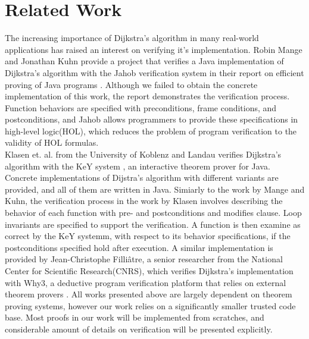 
\section{Related Work}
The increasing importance of Dijkstra's algorithm in many real-world applications has raised an interest on verifying it's implementation. Robin Mange and Jonathan Kuhn provide a project that verifies a Java implementation of Dijkstra's algorithm with the Jahob verification system in their report on efficient proving of Java programs \cite{Mange}. Although we failed to obtain the concrete implementation of this work, the report demonstrates the verification process. Function behaviors are specified with preconditions, frame conditions, and postconditions, and Jahob allows programmers to provide these specifications in high-level logic(HOL), which reduces the problem of program verification to the validity of HOL formulas. 
\\

Klasen et. al. from the University of Koblenz and Landau verifies Dijkstra's algorithm with the KeY system \cite{Klasen}, an interactive theorem prover for Java. Concrete implementations of Dijstra's algorithm with different variants are provided, and all of them are written in Java. Simiarly to the work by Mange and Kuhn, the verification process in the work by Klasen involves describing the behavior of each function with pre- and postconditions and modifies clause. Loop invariants are specified to support the verification. A function is then examine as correct by the KeY systemm, with respect to its behavior specifications, if the postconditions specified hold after execution. A similar implementation is provided by Jean-Christophe Filliâtre, a senior researcher from the National Center for Scientific Research(CNRS), which verifies Dijkstra's implementation with Why3, a deductive program verification platform that relies on external theorem provers \cite{Jean}\cite{why3}. All works presented above are largely dependent on theorem proving systems, however our work relies on a significantly smaller trusted code base. Most proofs in our work will be implemented from scratches, and considerable amount of details on verification will be presented explicitly.
\\

